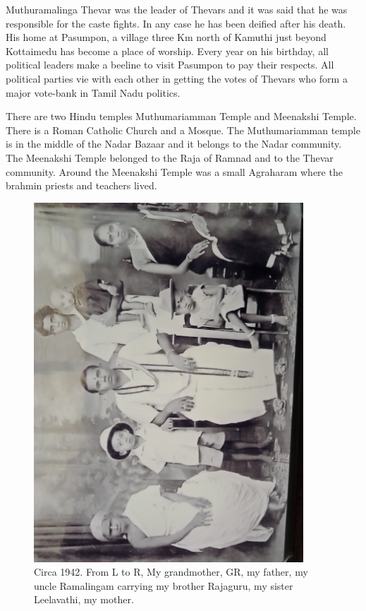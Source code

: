 Muthuramalinga Thevar was the leader of Thevars and it was said that he 
was responsible for the caste fights. In any case he has been deified 
after his death. His home at Pasumpon, a village three Km north of 
Kamuthi just beyond Kottaimedu has become a place of worship. Every year 
on his birthday, all political leaders make a beeline to visit Pasumpon 
to pay their respects. All political parties vie with each other in 
getting the votes of Thevars who form a major vote-bank in Tamil Nadu 
politi\-cs.
 
There are two Hindu temples Muthumariamman Temple and Meenakshi Temple. 
There is a Roman Catholic Church and a Mosque. The Muthumariamman temple 
is in the middle of the Nadar Bazaar and it belongs to the Nadar 
community. The Mee\-nakshi Temple belonged to the Raja of Ramnad and to 
the Thevar community. Around the Meenakshi Temple was a small Agraharam 
where the brahmin priests and teachers lived.
\smallskip

\begin{figure}[H]
\centering 
\includegraphics[angle=270, width=0.9\textwidth]{images/Rajaji-01.jpg}
\caption{\small{Circa 1942. From L to R, My grandmother, GR, my father, 
my uncle Ramalingam carrying my brother Rajaguru, my sister
Leelavathi, my mother.}}
\end{figure}

